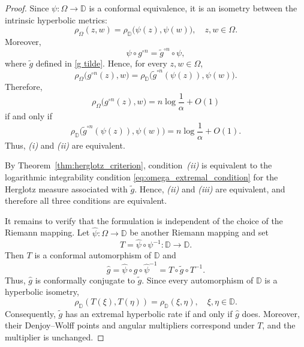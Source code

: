 \documentclass[12pt]{amsart}
\numberwithin{equation}{section}
\theoremstyle{plain}
\theoremstyle{definition}
\begin{document}
\begin{proof}
Since $\psi:\Omega\to\mathbb{D}$ is a conformal equivalence, it is an
isometry between the intrinsic hyperbolic metrics:
\begin{equation*}
\label{eq:riemann_hyperbolic_isometry}
\rho_\Omega(z,w)
=
\rho_{\mathbb{D}}\bigl(\psi(z),\psi(w)\bigr),
\quad z,w\in\Omega.
\end{equation*}
Moreover,
\begin{equation*}
\psi\circ g^{\circ n}
=
\widetilde g^{\circ n}\circ\psi,
\end{equation*}
where $\widetilde g$ defined in \eqref{g tilde}.
Hence, for every $z,w\in\Omega$,
\begin{equation*}
\label{eq:orbit_conjugacy}
\rho_\Omega\bigl(g^{\circ n}(z),w\bigr)
=
\rho_{\mathbb{D}}
\bigl(\widetilde g^{\circ n}(\psi(z)),\psi(w)\bigr).
\end{equation*}
Therefore,
\begin{equation*}
\rho_\Omega\bigl(g^{\circ n}(z),w\bigr)
=
n\log\frac1\alpha+O(1)
\end{equation*}
if and only if
\begin{equation*}
\rho_{\mathbb{D}}
\bigl(\widetilde g^{\circ n}(\psi(z)),\psi(w)\bigr)
=
n\log\frac1\alpha+O(1).
\end{equation*}
Thus, \emph{(i)} and \emph{(ii)} are equivalent.

By Theorem~\ref{thm:herglotz_criterion}, condition~\emph{(ii)} is
equivalent to the logarithmic integrability condition
\eqref{eq:omega_extremal_condition} for the Herglotz measure
associated with $\widetilde g$. Hence, \emph{(ii)} and \emph{(iii)} are
equivalent, and therefore all three conditions are equivalent.

It remains to verify that the formulation is independent of the choice of the Riemann mapping. Let
$\widehat\psi:\Omega\to\mathbb{D}$ be another Riemann mapping and set
\begin{equation*}
T=\widehat\psi\circ\psi^{-1}:\mathbb{D}\to\mathbb{D}.
\end{equation*}
Then $T$ is a conformal automorphism of $\mathbb{D}$ and
\begin{equation*}
\widehat g
=
\widehat\psi\circ g\circ\widehat\psi^{-1}
=
T\circ\widetilde g\circ T^{-1}.
\end{equation*}
Thus, $\widehat g$ is conformally conjugate to $\widetilde g$. Since
every automorphism of $\mathbb{D}$ is a hyperbolic isometry,
\begin{equation*}
\rho_{\mathbb{D}}(T(\xi),T(\eta))
=
\rho_{\mathbb{D}}(\xi,\eta),
\quad \xi,\eta\in\mathbb{D}.
\end{equation*}
Consequently, $\widetilde g$ has an extremal hyperbolic rate if and
only if $\widehat g$ does. Moreover, their Denjoy--Wolff points and
angular multipliers correspond under $T$, and the multiplier is
unchanged.


\end{proof}
\end{document}
